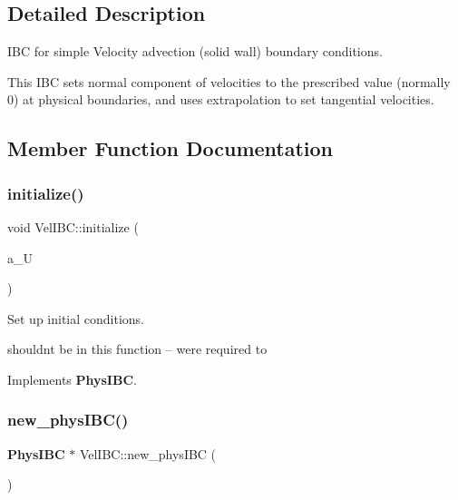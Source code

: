 \subsection{Detailed Description}
I\+BC for simple Velocity advection (solid wall) boundary conditions. 

This I\+BC sets normal component of velocities to the prescribed value (normally 0) at physical boundaries, and uses extrapolation to set tangential velocities. 

\subsection{Member Function Documentation}
\mbox{\label{class_vel_i_b_c_a0f2d126d3a569f828e0370c0c7dc6ec9}} 
\subsubsection{\texorpdfstring{initialize()}{initialize()}}
{\footnotesize\ttfamily void Vel\+I\+B\+C\+::initialize (\begin{DoxyParamCaption}\item[{\textbf{ Level\+Data}$<$ \textbf{ F\+Array\+Box} $>$ \&}]{a\+\_\+U }\end{DoxyParamCaption})\hspace{0.3cm}{\ttfamily [virtual]}}



Set up initial conditions. 

shouldn\textquotesingle{}t be in this function -- we\textquotesingle{}re required to 

Implements \textbf{ Phys\+I\+BC}.

\mbox{\label{class_vel_i_b_c_ac53daf9706542e3fa4734c8701f5fff5}} 
\subsubsection{\texorpdfstring{new\+\_\+phys\+I\+B\+C()}{new\_physIBC()}}
{\footnotesize\ttfamily \textbf{ Phys\+I\+BC} $\ast$ Vel\+I\+B\+C\+::new\+\_\+phys\+I\+BC (\begin{DoxyParamCaption}{ }\end{DoxyParamCaption})\hspace{0.3cm}{\ttfamily [virtual]}}




